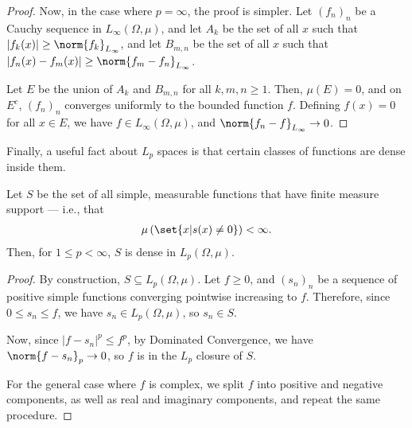 \documentclass[10pt]{mypackage}
\begin{document}
\begin{proof}
  Now, in the case where $p = \infty$, the proof is simpler. Let $\left( f_n \right)_n$ be a Cauchy sequence in $L_{\infty}\left( \Omega,\mu \right)$, and let $A_{k}$ be the set of all $x$ such that $\left\vert f_k(x) \right\vert\geq \norm{f_k}_{L_\infty}$, and let $B_{m,n}$ be the set of all $x$ such that $\left\vert f_n(x)-f_m(x) \right\vert \geq \norm{f_m - f_n}_{L_\infty}$.\newline

  Let $E$ be the union of $A_k$ and $B_{m,n}$ for all $k,m,n \geq 1$. Then, $\mu\left( E \right) = 0$, and on $E^{c}$, $\left( f_n \right)_n$ converges uniformly to the bounded function $f$. Defining $f(x) = 0$ for all $x\in E$, we have $f\in L_{\infty}\left( \Omega,\mu \right)$, and $\norm{f_n - f}_{L_{\infty}}\rightarrow 0$.
\end{proof}
Finally, a useful fact about $L_p$ spaces is that certain classes of functions are dense inside them.
\begin{theorem}
  Let $S$ be the set of all simple, measurable functions that have finite measure support --- i.e., that
  \begin{align*}
    \mu\left( \set{x | s(x)\neq 0} \right) < \infty.
  \end{align*}
  Then, for $1\leq p < \infty$, $S$ is dense in $L_p\left( \Omega,\mu \right)$.
\end{theorem}
\begin{proof}
  By construction, $S\subseteq L_p\left( \Omega,\mu \right)$. Let $f\geq 0$, and $\left( s_n \right)_n$ be a sequence of positive simple functions converging pointwise increasing to $f$. Therefore, since $0\leq s_n \leq f$, we have $s_n\in L_p\left( \Omega,\mu \right)$, so $s_n\in S$.\newline

  Now, since $\left\vert f - s_n \right\vert^{p}\leq f^p$, by Dominated Convergence, we have $\norm{f - s_n}_{p} \rightarrow 0$, so $f$ is in the $L_p$ closure of $S$.\newline

  For the general case where $f$ is complex, we split $f$ into positive and negative components, as well as real and imaginary components, and repeat the same procedure.
\end{proof}
\end{document}
